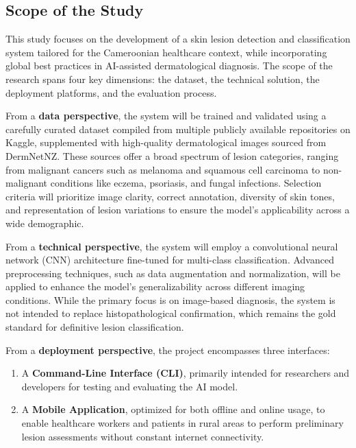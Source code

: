 \documentclass[
  12pt,
  oneside]{article}
\providecommand{\tightlist}{%
  \setlength{\itemsep}{0pt}\setlength{\parskip}{0pt}}
\begin{document}
\subsection{Scope of the Study}\label{scope-of-the-study}

This study focuses on the development of a skin lesion detection and
classification system tailored for the Cameroonian healthcare context,
while incorporating global best practices in AI-assisted dermatological
diagnosis. The scope of the research spans four key dimensions: the
dataset, the technical solution, the deployment platforms, and the
evaluation process.

From a \textbf{data perspective}, the system will be trained and
validated using a carefully curated dataset compiled from multiple
publicly available repositories on Kaggle, supplemented with
high-quality dermatological images sourced from DermNetNZ. These sources
offer a broad spectrum of lesion categories, ranging from malignant
cancers such as melanoma and squamous cell carcinoma to non-malignant
conditions like eczema, psoriasis, and fungal infections. Selection
criteria will prioritize image clarity, correct annotation, diversity of
skin tones, and representation of lesion variations to ensure the
model's applicability across a wide demographic.

From a \textbf{technical perspective}, the system will employ a
convolutional neural network (CNN) architecture fine-tuned for
multi-class classification. Advanced preprocessing techniques, such as
data augmentation and normalization, will be applied to enhance the
model's generalizability across different imaging conditions. While the
primary focus is on image-based diagnosis, the system is not intended to
replace histopathological confirmation, which remains the gold standard
for definitive lesion classification.

From a \textbf{deployment perspective}, the project encompasses three
interfaces:

\begin{enumerate}
\def\labelenumi{\arabic{enumi}.}
\tightlist
\item
  A \textbf{Command-Line Interface (CLI)}, primarily intended for
  researchers and developers for testing and evaluating the AI model.\\
\item
  A \textbf{Mobile Application}, optimized for both offline and online
  usage, to enable healthcare workers and patients in rural areas to
  perform preliminary lesion assessments without constant internet
  connectivity.
\end{enumerate}
\end{document}
